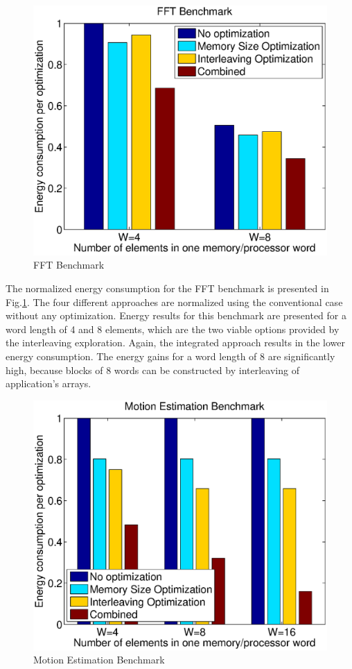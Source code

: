 \documentclass[prodmode,acmtodaes]{acmsmall}
\begin{document}
\begin{figure}
\centering
	\caption{FFT Benchmark}
	\label{fig:fft}
	\includegraphics[scale = 0.5]{Images/fft.eps} 
\end{figure}

The normalized energy consumption for the FFT benchmark is presented in Fig.\ref{fig:fft}.
The four different approaches are normalized using the conventional case without any optimization.
Energy results for this benchmark are presented for a word length of 4 and 8 elements, which are the two viable options provided by the interleaving exploration.
Again, the integrated approach results in the lower energy consumption.
The energy gains for a word length of 8 are significantly high, because blocks of 8 words can be constructed by interleaving of application's arrays.

\begin{figure}
\centering
	\caption{Motion Estimation Benchmark}
	\label{fig:mest}
	\includegraphics[scale = 0.5]{Images/mest.eps} 
\end{figure}
\end{document}
